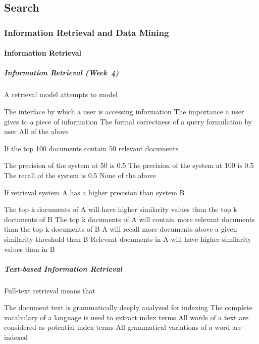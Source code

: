 \documentclass[12pt,a4paper]{exam} %
\begin{document}
\begin{flushleft}
\begin{multicols*}{2}
\begin{questions}
\part{Search}
\section{Information Retrieval and Data Mining}
\subsection{Information Retrieval} %
\subsubsection{Information Retrieval (Week~4)}

\question A retrieval model attempts to model
\begin{checkboxes}
\choice The interface by which a user is accessing information
\CorrectChoice The importance a user gives to a piece of information
\choice The formal correctness of a query formulation by user
\choice All of the above
\end{checkboxes}

\question If the top 100 documents contain 50 relevant documents
\begin{checkboxes}
\choice The precision of the system at 50 is 0.5
\CorrectChoice The precision of the system at 100 is 0.5
\choice The recall of the system is 0.5
\choice None of the above
\end{checkboxes}

\question If retrieval system A has a higher precision than system B
\begin{checkboxes}
\choice The top k documents of A will have higher similarity values than the top k documents of B
\CorrectChoice The top k documents of A will contain more relevant documents than the top k documents of B
\choice A will recall more documents above a given similarity threshold than B
\choice Relevant documents in A will have higher similarity values than in B
\end{checkboxes}


\subsubsection{Text-based Information Retrieval}

\question Full-text retrieval means that
\begin{checkboxes}
\choice The document text is grammatically deeply analyzed for indexing
\choice The complete vocabulary of a language is used to extract index terms
\CorrectChoice All words of a text are considered as potential index terms
\choice All grammatical variations of a word are indexed
\end{checkboxes}


\end{questions}
\end{multicols*}
\end{flushleft}
\end{document}
